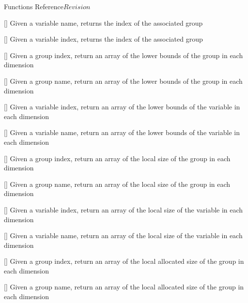 \begin{cactuspart}{ Functions Reference}{}{$Revision$}
\begin{Lentry}
\item[\code{CCTK\_GroupIndexFromVar}] [\pageref{CCTK-GroupIndexFromVar}]
  Given a variable name, returns the index of the associated group

\item[\code{CCTK\_GroupIndexFromVarI}] [\pageref{CCTK-GroupIndexFromVarI}]
  Given a variable index, returns the index of the associated group

\item[\code{CCTK\_GrouplbndGI}] [\pageref{CCTK-GrouplbndGI}]
  Given a group index, return an array of the lower bounds
  of the group in each dimension

\item[\code{CCTK\_GrouplbndGN}] [\pageref{CCTK-GrouplbndGN}]
  Given a group name, return an array of the lower bounds
  of the group in each dimension

\item[\code{CCTK\_GrouplbndVI}] [\pageref{CCTK-GrouplbndVI}]
  Given a variable index, return an array of the lower bounds
  of the variable in each dimension

\item[\code{CCTK\_GrouplbndVN}] [\pageref{CCTK-GrouplbndVN}]
  Given a variable name, return an array of the lower bounds
  of the variable in each dimension

\item[\code{CCTK\_GrouplshGI}] [\pageref{CCTK-GrouplshGI}]
  Given a group index, return an array of the local size
  of the group in each dimension

\item[\code{CCTK\_GrouplshGN}] [\pageref{CCTK-GrouplshGN}]
  Given a group name, return an array of the local size
  of the group in each dimension

\item[\code{CCTK\_GrouplshVI}] [\pageref{CCTK-GrouplshVI}]
  Given a variable index, return an array of the local size
  of the variable in each dimension

\item[\code{CCTK\_GrouplshVN}] [\pageref{CCTK-GrouplshVN}]
  Given a variable name, return an array of the local size
  of the variable in each dimension

\item[\code{CCTK\_GroupashGI}] [\pageref{CCTK-GroupashGI}]
  Given a group index, return an array of the local allocated size
  of the group in each dimension

\item[\code{CCTK\_GroupashGN}] [\pageref{CCTK-GroupashGN}]
  Given a group name, return an array of the local allocated size
  of the group in each dimension


\end{Lentry}
\end{cactuspart}
